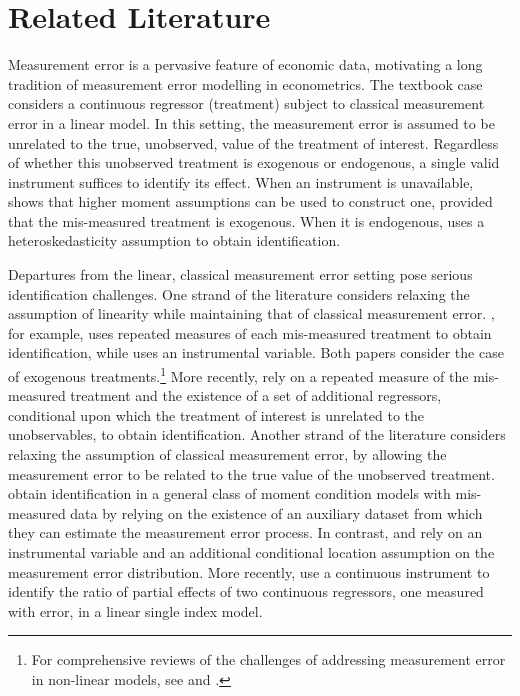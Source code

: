 \section{Related Literature}
Measurement error is a pervasive feature of economic data, motivating a long tradition of measurement error modelling in econometrics. 
The textbook case considers a continuous regressor (treatment) subject to classical measurement error in a linear model.
In this setting, the measurement error is assumed to be unrelated to the true, unobserved, value of the treatment of interest.
Regardless of whether this unobserved treatment is exogenous or endogenous, a single valid instrument suffices to identify its effect.
When an instrument is unavailable, \cite{lewbel1997} shows that higher moment assumptions can be used to construct one, provided that the mis-measured treatment is exogenous.
When it is endogenous, \cite{lewbel2012} uses a heteroskedasticity assumption to obtain identification.

Departures from the linear, classical measurement error setting pose serious identification challenges.
One strand of the literature considers relaxing the assumption of linearity while maintaining that of classical measurement error.
\cite{schennach2004}, for example, uses repeated measures of each mis-measured treatment to obtain identification, while \cite{schennach2007} uses an instrumental variable.  
Both papers consider the case of exogenous treatments.\footnote{For comprehensive reviews of the challenges of addressing measurement error in non-linear models, see  \cite{chensurvey} and \cite{SchennachSurvey}.}
More recently, \cite{SongSchennachWhite} rely on a repeated measure of the mis-measured treatment and the existence of a set of additional regressors, conditional upon which the treatment of interest is unrelated to the unobservables, to obtain identification.      
Another strand of the literature considers relaxing the assumption of classical measurement error, by allowing the measurement error to be related to the true value of the unobserved treatment.
\cite{ChenHongTamer} obtain identification in a general class of moment condition models with mis-measured data by relying on the existence of an auxiliary dataset from which they can estimate the measurement error process.
In contrast, \cite{HuSchennach} and \cite{song2015} rely on an instrumental variable and an additional conditional location assumption on the measurement error distribution. 
More recently, \cite{HuShiuWoutersen} use a continuous instrument to identify the ratio of partial effects of two continuous regressors, one measured with error, in a linear single index model.

